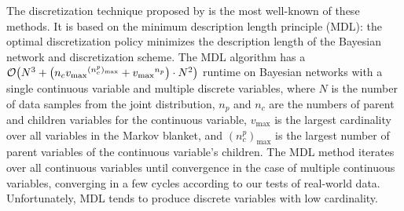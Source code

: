 The discretization technique proposed by \citet{Friedman_1996} is the most well-known of these methods. It is based on the minimum description length principle (MDL): the optimal discretization policy minimizes the description length of the Bayesian network and discretization scheme. The MDL algorithm has a $\bigo\paren{N^3 + \paren{n_c {v_\text{max}}^{(n_c^p)_\text{max}} + {v_\text{max}}^{n_p}} \cdot N^2}$ runtime on Bayesian networks with a single continuous variable and multiple discrete variables, where $N$ is the number of data samples from the joint distribution, $n_p$ and $n_c$ are the numbers of parent and children variables for the continuous variable, $v_\text{max}$ is the largest cardinality over all variables in the Markov blanket, and  ${(n_c^p)_\text{max}}$ is the largest number of parent variables of the continuous variable's children. The MDL method iterates over all continuous variables until convergence in the case of multiple continuous variables, converging in a few cycles according to our tests of real-world data. Unfortunately, MDL tends to produce discrete variables with low cardinality.



